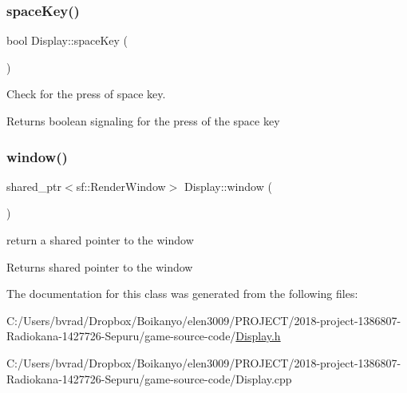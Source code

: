 \subsubsection{\texorpdfstring{space\+Key()}{spaceKey()}}
{\footnotesize\ttfamily bool Display\+::space\+Key (\begin{DoxyParamCaption}{ }\end{DoxyParamCaption})\hspace{0.3cm}{\ttfamily [inline]}}



Check for the press of space key. 

\begin{DoxyReturn}{Returns}
boolean signaling for the press of the space key 
\end{DoxyReturn}
\mbox{\label{class_display_a5e7a8c62af3817bbd66c7727943bbef9}} 
\subsubsection{\texorpdfstring{window()}{window()}}
{\footnotesize\ttfamily shared\+\_\+ptr$<$sf\+::\+Render\+Window$>$ Display\+::window (\begin{DoxyParamCaption}{ }\end{DoxyParamCaption})\hspace{0.3cm}{\ttfamily [inline]}}



return a shared pointer to the window 

\begin{DoxyReturn}{Returns}
shared pointer to the window 
\end{DoxyReturn}


The documentation for this class was generated from the following files\+:\begin{DoxyCompactItemize}
\item 
C\+:/\+Users/bvrad/\+Dropbox/\+Boikanyo/elen3009/\+P\+R\+O\+J\+E\+C\+T/2018-\/project-\/1386807-\/\+Radiokana-\/1427726-\/\+Sepuru/game-\/source-\/code/\mbox{\hyperlink{_display_8h}{Display.\+h}}\item 
C\+:/\+Users/bvrad/\+Dropbox/\+Boikanyo/elen3009/\+P\+R\+O\+J\+E\+C\+T/2018-\/project-\/1386807-\/\+Radiokana-\/1427726-\/\+Sepuru/game-\/source-\/code/Display.\+cpp\end{DoxyCompactItemize}
